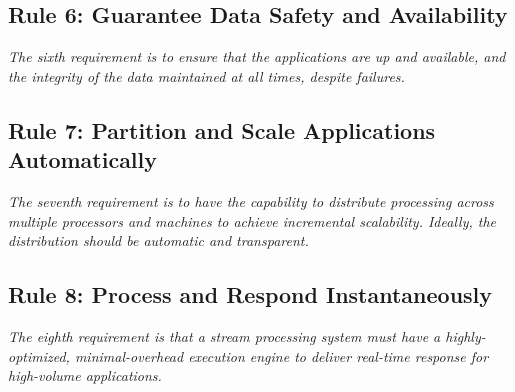 \subsection{Rule 6: Guarantee Data Safety and Availability}
\textit{The sixth requirement is to ensure that the applications are
        up and available, and the integrity of the data maintained at
        all times, despite failures.}


\subsection{Rule 7: Partition and Scale Applications Automatically}
\textit{The seventh requirement is to have the capability to
        distribute processing across multiple processors and
        machines to achieve incremental scalability. Ideally, the
        distribution should be automatic and transparent.}

\subsection{Rule 8: Process and Respond Instantaneously}
\textit{The eighth requirement is that a stream processing system
must have a highly-optimized, minimal-overhead execution
engine to deliver real-time response for high-volume
applications.}





























